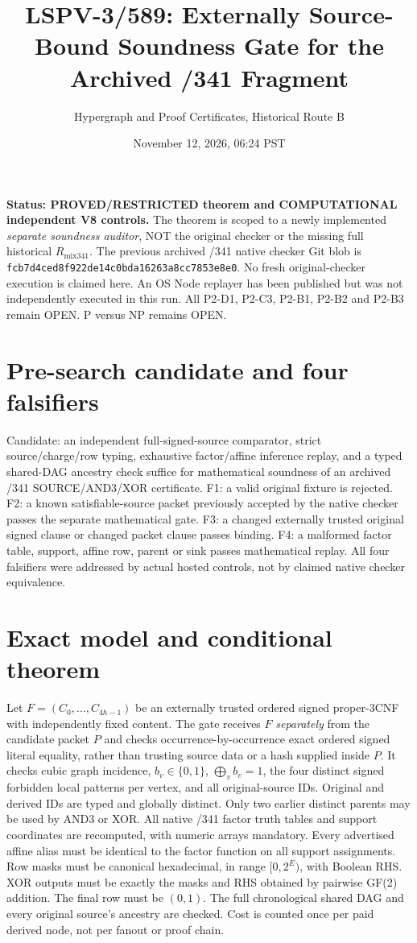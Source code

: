 \documentclass[10pt]{article}
\title{LSPV-3/589: Externally Source-Bound Soundness Gate for the Archived /341 Fragment}
\author{Hypergraph and Proof Certificates, Historical Route B}
\date{November 12, 2026, 06:24 PST}
\begin{document}
\maketitle

\noindent\textbf{Status: PROVED/RESTRICTED theorem and COMPUTATIONAL independent V8 controls.}
The theorem is scoped to a newly implemented \emph{separate soundness auditor}, NOT the original checker or the missing full historical $R_{\mathrm{mix341}}$.
The previous archived /341 native checker Git blob is
\texttt{fcb7d4ced8f922de14c0bda16263a8cc7853e8e0}.
No fresh original-checker execution is claimed here.
An OS Node replayer has been published but was not independently executed in this run.
All P2-D1, P2-C3, P2-B1, P2-B2 and P2-B3 remain OPEN. P versus NP remains OPEN.

\section*{Pre-search candidate and four falsifiers}
Candidate: an independent full-signed-source comparator, strict source/charge/row typing, exhaustive factor/affine inference replay, and a typed shared-DAG ancestry check suffice for mathematical soundness of an archived /341 SOURCE/AND3/XOR certificate.
F1: a valid original fixture is rejected.
F2: a known satisfiable-source packet previously accepted by the native checker passes the separate mathematical gate.
F3: a changed externally trusted original signed clause or changed packet clause passes binding.
F4: a malformed factor table, support, affine row, parent or sink passes mathematical replay.
All four falsifiers were addressed by actual hosted controls, not by claimed native checker equivalence.

\section*{Exact model and conditional theorem}
Let $F=(C_0,\ldots,C_{4h-1})$ be an externally trusted ordered signed proper-3CNF with independently fixed content. The gate receives $F$ \emph{separately} from the candidate packet $P$ and checks occurrence-by-occurrence exact ordered signed literal equality, rather than trusting source data or a hash supplied inside $P$. It checks cubic graph incidence, $b_v\in\{0,1\}$, $\bigoplus_v b_v=1$, the four distinct signed forbidden local patterns per vertex, and all original-source IDs. Original and derived IDs are typed and globally distinct. Only two earlier distinct parents may be used by AND3 or XOR. All native /341 factor truth tables and support coordinates are recomputed, with numeric arrays mandatory. Every advertised affine alias must be identical to the factor function on all support assignments. Row masks must be canonical hexadecimal, in range $[0,2^E)$, with Boolean RHS. XOR outputs must be exactly the masks and RHS obtained by pairwise GF(2) addition. The final row must be $(0,1)$. The full chronological shared DAG and every original source's ancestry are checked. Cost is counted once per paid derived node, not per fanout or proof chain.
\end{document}
